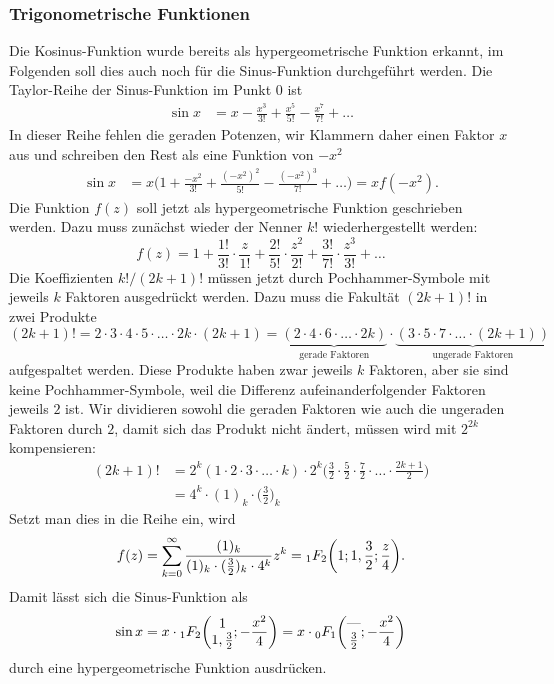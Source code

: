 \subsubsection{Trigonometrische Funktionen}
Die Kosinus-Funktion wurde bereits als hypergeometrische Funktion erkannt,
im Folgenden soll dies auch noch für die Sinus-Funktion
durchgeführt werden.
Die Taylor-Reihe der Sinus-Funktion im Punkt $0$ ist
\begin{align*}
\sin x
&=
x-\frac{x^3}{3!}+\frac{x^5}{5!}-\frac{x^7}{7!}+\dots
\end{align*}
In dieser Reihe fehlen die geraden Potenzen, wir Klammern daher einen
Faktor $x$ aus und schreiben den Rest als eine Funktion von $-x^2$
\begin{align*}
\sin x
&=
x
\biggl(
1+\frac{-x^2}{3!}+\frac{(-x^2)^2}{5!}-\frac{(-x^2)^3}{7!}+\dots
\biggr)
=
x f(-x^2).
\end{align*}
Die Funktion $f(z)$ soll jetzt als hypergeometrische Funktion geschrieben
werden.
Dazu muss zunächst wieder der Nenner $k!$ wiederhergestellt werden:
\[
f(z)
=
1
+
\frac{1!}{3!}\cdot \frac{z}{1!}
+
\frac{2!}{5!}\cdot \frac{z^2}{2!}
+
\frac{3!}{7!}\cdot \frac{z^3}{3!}
+
\dots
\]
Die Koeffizienten $k!/(2k+1)!$ müssen jetzt durch Pochhammer-Symbole
mit jeweils $k$ Faktoren ausgedrückt werden.
Dazu muss die Fakultät $(2k+1)!$ in zwei Produkte
\[
(2k+1)!
=
2\cdot 3 \cdot 4\cdot 5\cdot \ldots \cdot 2k \cdot (2k+1)
=
\underbrace{(2\cdot 4 \cdot 6\cdot\ldots\cdot 2k)}_{\textstyle\text{gerade Faktoren}}
\cdot
\underbrace{(3\cdot 5\cdot 7\cdot \ldots \cdot (2k+1))}_{\textstyle\text{ungerade Faktoren}}
\]
aufgespaltet werden.
Diese Produkte haben zwar jeweils $k$ Faktoren, aber sie sind keine
Pochhammer-Symbole, weil die Differenz aufeinanderfolgender Faktoren 
jeweils $2$ ist.
Wir dividieren sowohl die geraden Faktoren wie auch die 
ungeraden Faktoren durch $2$, damit sich das Produkt nicht ändert,
müssen wird mit $2^{2k}$ kompensieren:
\begin{align*}
(2k+1)!
&=
2^k(1\cdot2\cdot3\cdot\ldots\cdot k)
\cdot
2^k
\biggl(
\frac{3}{2}\cdot
\frac{5}{2}\cdot
\frac{7}{2}\cdot
\ldots\cdot
\frac{2k+1}{2}
\biggr)
\\
&=
4^k
\cdot
(1)_k\cdot \biggl(\frac{3}{2}\biggr)_k
\end{align*}
Setzt man dies in die Reihe ein, wird
\[
f(z)
=
\sum_{k=0}^\infty
\frac{(1)_k}{(1)_k\cdot (\frac{3}{2})_k\cdot 4^k}
z^k
=
\mathstrut_1F_2\biggl(1;1,\frac{3}{2};\frac{z}4\biggr).
\]
Damit lässt sich die Sinus-Funktion als
\begin{equation}
\sin x
=
x\cdot \mathstrut_1F_2\biggl(
\begin{matrix}1\\1,\frac32\end{matrix};-\frac{x^2}4
\biggr)
=
x\cdot\mathstrut_0F_1\biggl(
\begin{matrix}\text{---}\\\frac32\end{matrix};-\frac{x^2}4
\biggr)
\label{buch:rekursion:hypergeometrisch:eqn:sinhyper}
\end{equation}
durch eine hypergeometrische Funktion ausdrücken.

